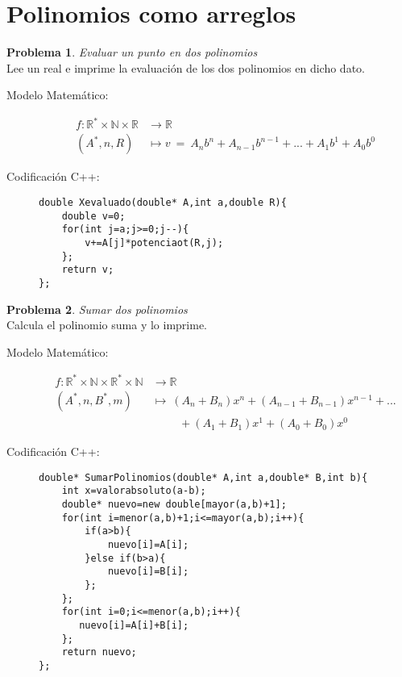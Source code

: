 \documentclass{article}
\theoremstyle{plain}
\theoremstyle{definition}
\newtheorem{problem}{Problema}
\begin{document}
\section{Polinomios como arreglos}
\begin{problem} \emph{Evaluar un punto en dos polinomios}\\
Lee un real e imprime la evaluación de los dos polinomios en dicho dato.
%
\begin{description}
\item[Modelo Matemático:]
%
\begin{align*}
f: \mathbb{R}^*\times\mathbb{N}\times\mathbb{R}&\to \mathbb{R}\\
(A^*,n,R) &\mapsto v\ =\ A_n b^n + A_{n-1} b^{n-1} + ... + A_1 b^1 + A_0 b^0
\end{align*}
%
\item[Codificación \textsf{C++}:]\hfill
%
\begin{verbatim}
double Xevaluado(double* A,int a,double R){
    double v=0;
    for(int j=a;j>=0;j--){
        v+=A[j]*potenciaot(R,j);
    };
    return v;
};
\end{verbatim}
\end{description}
\end{problem}
\begin{problem} \emph{Sumar dos polinomios}\\
Calcula el polinomio suma y lo imprime.
%
\begin{description}
\item[Modelo Matemático:]
%
\begin{align*}
f: \mathbb{R}^*\times\mathbb{N}\times\mathbb{R}^*\times\mathbb{N}&\to \mathbb{R}\\
(A^*,n,B^*,m) &\mapsto \ (A_n+B_n) x^n + (A_{n-1}+B_{n-1}) x^{n-1} + ... \\& \hspace{1cm} + (A_1+ B_1) x^1 + (A_0+B_0) x^0
\end{align*}
%
\item[Codificación \textsf{C++}:]\hfill
%
\begin{verbatim}
double* SumarPolinomios(double* A,int a,double* B,int b){
    int x=valorabsoluto(a-b);
    double* nuevo=new double[mayor(a,b)+1];
    for(int i=menor(a,b)+1;i<=mayor(a,b);i++){ 
        if(a>b){
            nuevo[i]=A[i];
        }else if(b>a){
       	    nuevo[i]=B[i];
	    };
	};
	for(int i=0;i<=menor(a,b);i++){
       nuevo[i]=A[i]+B[i];
	};
    return nuevo;
};
\end{verbatim}
\end{description}
\end{problem}
\end{document}
